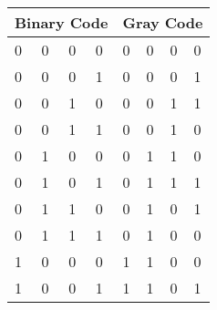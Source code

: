 \documentclass[11pt]{article}
\begin{document}
\begin{table}[H]
	\begin{tabular}{|llll|llll|}
	\hline
	\multicolumn{4}{|l|}{\textbf{Binary Code}}                                             & \multicolumn{4}{l|}{\textbf{Gray Code}}                                               \\ \hline
	\multicolumn{1}{|l|}{0} & \multicolumn{1}{l|}{0} & \multicolumn{1}{l|}{0} & 0 & \multicolumn{1}{l|}{0} & \multicolumn{1}{l|}{0} & \multicolumn{1}{l|}{0} & 0 \\ \hline
	\multicolumn{1}{|l|}{0} & \multicolumn{1}{l|}{0} & \multicolumn{1}{l|}{0} & 1 & \multicolumn{1}{l|}{0} & \multicolumn{1}{l|}{0} & \multicolumn{1}{l|}{0} & 1 \\ \hline
	\multicolumn{1}{|l|}{0} & \multicolumn{1}{l|}{0} & \multicolumn{1}{l|}{1} & 0 & \multicolumn{1}{l|}{0} & \multicolumn{1}{l|}{0} & \multicolumn{1}{l|}{1} & 1 \\ \hline
	\multicolumn{1}{|l|}{0} & \multicolumn{1}{l|}{0} & \multicolumn{1}{l|}{1} & 1 & \multicolumn{1}{l|}{0} & \multicolumn{1}{l|}{0} & \multicolumn{1}{l|}{1} & 0 \\ \hline
	\multicolumn{1}{|l|}{0} & \multicolumn{1}{l|}{1} & \multicolumn{1}{l|}{0} & 0 & \multicolumn{1}{l|}{0} & \multicolumn{1}{l|}{1} & \multicolumn{1}{l|}{1} & 0 \\ \hline
	\multicolumn{1}{|l|}{0} & \multicolumn{1}{l|}{1} & \multicolumn{1}{l|}{0} & 1 & \multicolumn{1}{l|}{0} & \multicolumn{1}{l|}{1} & \multicolumn{1}{l|}{1} & 1 \\ \hline
	\multicolumn{1}{|l|}{0} & \multicolumn{1}{l|}{1} & \multicolumn{1}{l|}{1} & 0 & \multicolumn{1}{l|}{0} & \multicolumn{1}{l|}{1} & \multicolumn{1}{l|}{0} & 1 \\ \hline
	\multicolumn{1}{|l|}{0} & \multicolumn{1}{l|}{1} & \multicolumn{1}{l|}{1} & 1 & \multicolumn{1}{l|}{0} & \multicolumn{1}{l|}{1} & \multicolumn{1}{l|}{0} & 0 \\ \hline
	\multicolumn{1}{|l|}{1} & \multicolumn{1}{l|}{0} & \multicolumn{1}{l|}{0} & 0 & \multicolumn{1}{l|}{1} & \multicolumn{1}{l|}{1} & \multicolumn{1}{l|}{0} & 0 \\ \hline
	\multicolumn{1}{|l|}{1} & \multicolumn{1}{l|}{0} & \multicolumn{1}{l|}{0} & 1 & \multicolumn{1}{l|}{1} & \multicolumn{1}{l|}{1} & \multicolumn{1}{l|}{0} & 1 \\ \hline

\end{tabular}
\end{table}
\end{document}
